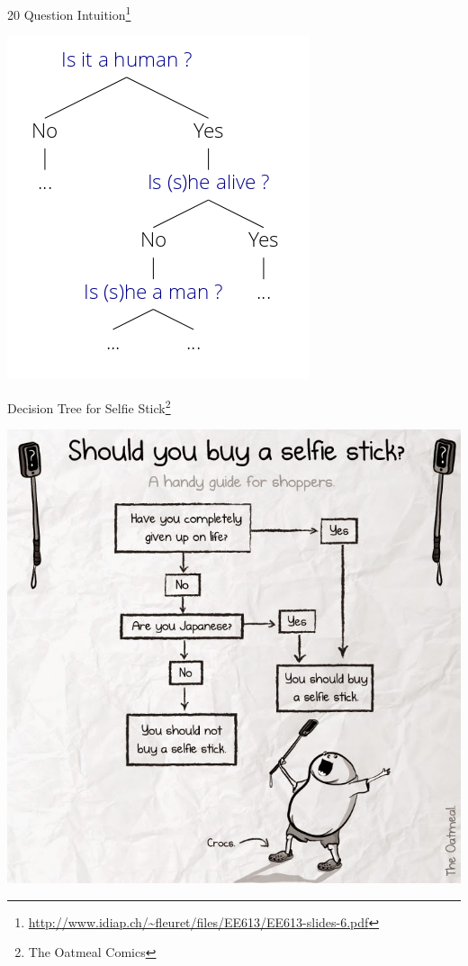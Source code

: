 \documentclass{beamer}
\newcommand{\furl}[1]{{\footnote{\url{#1}}}}
\begin{document}
\begin{frame}{20 Question Intuition\furl{http://www.idiap.ch/~fleuret/files/EE613/EE613-slides-6.pdf}}
    \begin{center}
        \includegraphics[scale=0.4]{20QAsDTree.png}
    \end{center}
\end{frame}
\begin{frame}{Decision Tree for Selfie Stick\footnote{The Oatmeal Comics}}
    \begin{center}
        \includegraphics[scale=0.30]{selfie_stick.jpg}
    \end{center}
\end{frame}
\end{document}
